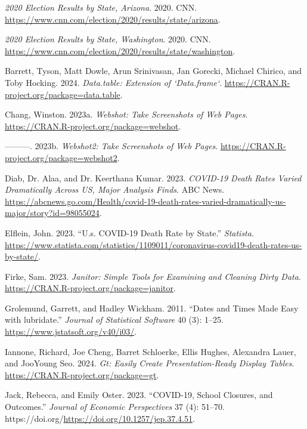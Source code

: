 \documentclass[
  letterpaper,
  DIV=11,
  numbers=noendperiod]{scrartcl}
\newlength{\cslhangindent}
\newenvironment{CSLReferences}[2] %
 {\begin{list}{}{%
  \setlength{\itemindent}{0pt}
  \setlength{\leftmargin}{0pt}
  \setlength{\parsep}{0pt}
  \ifodd #1
   \setlength{\leftmargin}{\cslhangindent}
   \setlength{\itemindent}{-1\cslhangindent}
  \fi
  \setlength{\itemsep}{#2\baselineskip}}}
 {\end{list}}
\begin{document}
\label{refs}
\begin{CSLReferences}{1}{0}
\emph{2020 Election Results by State, Arizona}. 2020. CNN.
\url{https://www.cnn.com/election/2020/results/state/arizona}.

\emph{2020 Election Results by State, Washington}. 2020. CNN.
\url{https://www.cnn.com/election/2020/results/state/washington}.

Barrett, Tyson, Matt Dowle, Arun Srinivasan, Jan Gorecki, Michael
Chirico, and Toby Hocking. 2024. \emph{Data.table: Extension of
`Data.frame`}. \url{https://CRAN.R-project.org/package=data.table}.

Chang, Winston. 2023a. \emph{Webshot: Take Screenshots of Web Pages}.
\url{https://CRAN.R-project.org/package=webshot}.

---------. 2023b. \emph{Webshot2: Take Screenshots of Web Pages}.
\url{https://CRAN.R-project.org/package=webshot2}.

Diab, Dr. Alaa, and Dr. Keerthana Kumar. 2023. \emph{COVID-19 Death
Rates Varied Dramatically Across US, Major Analysis Finds}. ABC News.
\url{https://abcnews.go.com/Health/covid-19-death-rates-varied-dramatically-us-major/story?id=98055024}.

Elflein, John. 2023. {``U.s. COVID-19 Death Rate by State.''}
\emph{Statista}.
\url{https://www.statista.com/statistics/1109011/coronavirus-covid19-death-rates-us-by-state/}.

Firke, Sam. 2023. \emph{Janitor: Simple Tools for Examining and Cleaning
Dirty Data}. \url{https://CRAN.R-project.org/package=janitor}.

Grolemund, Garrett, and Hadley Wickham. 2011. {``Dates and Times Made
Easy with {lubridate}.''} \emph{Journal of Statistical Software} 40 (3):
1--25. \url{https://www.jstatsoft.org/v40/i03/}.

Iannone, Richard, Joe Cheng, Barret Schloerke, Ellis Hughes, Alexandra
Lauer, and JooYoung Seo. 2024. \emph{Gt: Easily Create
Presentation-Ready Display Tables}.
\url{https://CRAN.R-project.org/package=gt}.

Jack, Rebecca, and Emily Oster. 2023. {``COVID-19, School Closures, and
Outcomes.''} \emph{Journal of Economic Perspectives} 37 (4): 51--70.
https://doi.org/\url{https://doi.org/10.1257/jep.37.4.51}.


\end{CSLReferences}
\end{document}
